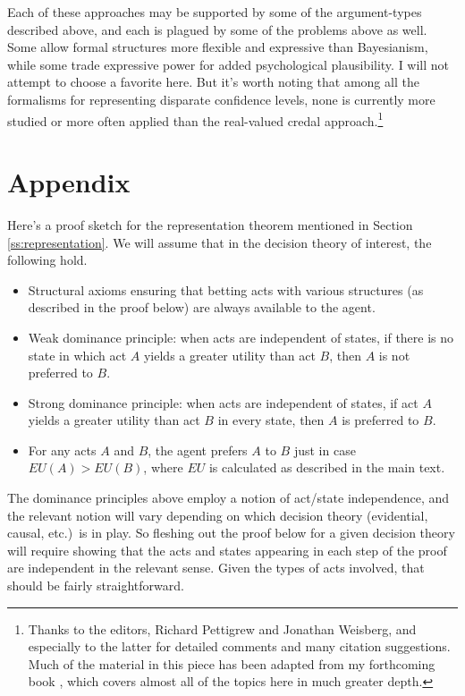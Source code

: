 Each of these approaches may be supported by some of the argument-types described above, and each is plagued by some of the problems above as well. Some allow formal structures more flexible and expressive than Bayesianism, while some trade expressive power for added psychological plausibility. I will not attempt to choose a favorite here. But it's worth noting that among all the formalisms for representing disparate confidence levels, none is currently more studied or more often applied than the real-valued credal approach.\footnote
{Thanks to the editors, Richard Pettigrew and Jonathan Weisberg, and especially to the latter for detailed comments and many citation suggestions.  Much of the material in this piece has been adapted from my forthcoming book \citep{TitelbaumFBE}, which covers almost all of the topics here in much greater depth.} 



\section{Appendix}

Here's a proof sketch for the representation theorem mentioned in Section \ref{ss:representation}. We will assume that in the decision theory of interest, the following hold.
\begin{itemize}
\item Structural axioms ensuring that betting acts with various structures (as described in the proof below) are always available to the agent.
\item Weak dominance principle: when acts are independent of states, if there is no state in which act $A$ yields a greater utility than act $B$, then $A$ is not preferred to $B$.
\item Strong dominance principle: when acts are independent of states, if act $A$ yields a greater utility than act $B$ in every state, then $A$ is preferred to $B$.
\item For any acts $A$ and $B$, the agent prefers $A$ to $B$ just in case $EU(A)>EU(B)$, where $EU$ is calculated as described in the main text.
\end{itemize}

The dominance principles above employ a notion of act/state independence, and the relevant notion will vary depending on which decision theory (evidential, causal, etc.)\ is in play.  So fleshing out the proof below for a given decision theory will require showing that the acts and states appearing in each step of the proof are independent in the relevant sense. Given the types of acts involved, that should be fairly straightforward.

